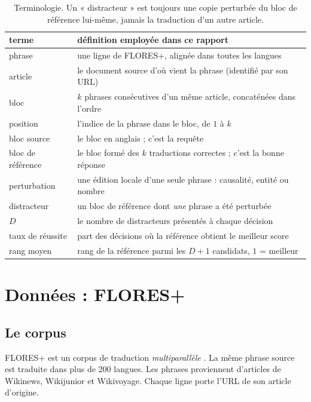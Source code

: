 \documentclass[11pt]{article}
\begin{document}
\begin{table}[t]
\centering\small
\begin{tabular}{p{4.1cm} p{10.3cm}}
\toprule
terme & définition employée dans ce rapport\\
\midrule
phrase & une ligne de FLORES+, alignée dans toutes les langues\\
article & le document source d'où vient la phrase (identifié par son URL)\\
bloc & $k$ phrases consécutives d'un même article, concaténées dans l'ordre\\
position & l'indice de la phrase dans le bloc, de $1$ à $k$\\
bloc source & le bloc en anglais ; c'est la requête\\
bloc de référence & le bloc formé des $k$ traductions correctes ; c'est la bonne réponse\\
perturbation & une édition locale d'une seule phrase : causalité, entité ou nombre\\
distracteur & un bloc de référence dont \emph{une} phrase a été perturbée\\
$D$ & le nombre de distracteurs présentés à chaque décision\\
taux de réussite & part des décisions où la référence obtient le meilleur score\\
rang moyen & rang de la référence parmi les $D+1$ candidats, $1$ = meilleur\\
\bottomrule
\end{tabular}
\caption{Terminologie. Un « distracteur » est toujours une copie perturbée du bloc de référence lui-même, jamais la traduction d'un autre article.}
\label{tab:vocab}
\end{table}

\section{Données : FLORES+}

\subsection{Le corpus}

FLORES+ est un corpus de traduction \emph{multiparallèle} \citep{nllb2022,goyal2022flores,oldi2024flores}.
La même phrase source est traduite dans plus de 200 langues.
Les phrases proviennent d'articles de Wikinews, Wikijunior et Wikivoyage.
Chaque ligne porte l'URL de son article d'origine.
\end{document}
